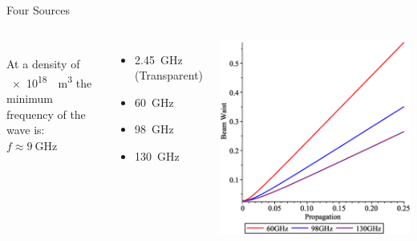 \documentclass[hyperref={colorlinks=true,urlcolor=blue,linkcolor=.},aspectratio=1610,mathserif]{beamer}
\begin{document}
\begin{frame}{Four Sources}
	\begin{columns}
		\\
		At a density of \SI{e18}{\per\meter\cubed} the minimum frequency of the wave is:
		\(f \approx \SI{9}{\giga\hertz}\)\newline
		\begin{itemize}
			\item \SI{2.45}{\giga\hertz} (Transparent)
			\item \SI{60}{\giga\hertz}
			\item \SI{98}{\giga\hertz}
			\item \SI{130}{\giga\hertz}
		\end{itemize}
		\includegraphics[width=\textwidth]{Figures/BeamProp.eps}
	\end{columns}
\end{frame}
\end{document}
